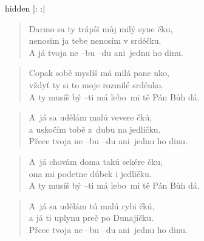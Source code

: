\begin{song}{}
  \begin{optional}{hidden}
|:       :|
\end{optional}
\begin{verse}
   Darmo sa ty trápíš můj milý syne čku, \\
   nenosím ja tebe nenosím v srdéčku. \\
   A já tvoja ne --bu --du ani~jednu ho dinu. 
\end{verse}
\begin{verse}
   Copak sobě myslíš má milá pane nko, \\
   vždyť ty si to moje rozmilé srdénko. \\
   A ty musíš bý --ti má lebo~mi tě Pán Bůh dá. 
\end{verse}
\begin{verse}
   A~já sa udělám malú vevere čkú, \\
   a uskočím tobě z~dubu na jedličku. \\
   Přece tvoja ne --bu --du ani~jednu ho dinu. 
\end{verse}
\begin{verse}
   A~já chovám doma takú sekére čku, \\
   ona mi podetne dúbek i jedličku. \\
   A ty musíš bý --ti má lebo~mi tě Pán Bůh dá. 
\end{verse}
\begin{verse}
   A~já sa udělám tú malú rybi čkú, \\
   a já ti uplynu preč po Dunajíčku. \\
   Přece tvoja ne --bu --du ani~jednu ho dinu. 
\end{verse}
\begin{verse}

\end{verse}
\end{song}

